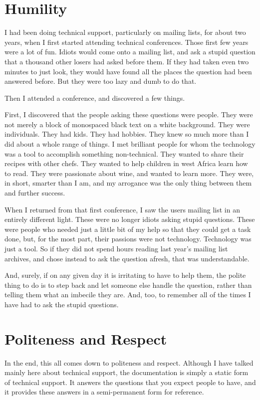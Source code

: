 \section*{Humility}
I had been doing technical support, particularly on mailing lists, for about two
years, when I first started attending technical conferences. Those first few
years were a lot of fun. Idiots would come onto a mailing list, and ask a stupid
question that a thousand other losers had asked before them. If they had taken
even two minutes to just look, they would have found all the places the question
had been answered before. But they were too lazy and dumb to do that.

Then I attended a conference, and discovered a few things.

First, I discovered that the people asking these questions were people. They
were not merely a block of monospaced black text on a white background. They
were individuals. They had kids. They had hobbies. They knew so much more than I
did about a whole range of things. I met brilliant people for whom the
technology was a tool to accomplish something non-technical. They wanted to
share their recipes with other chefs. They wanted to help children in west
Africa learn how to read. They were passionate about wine, and wanted to learn
more. They were, in short, smarter than I am, and my arrogance was the only
thing between them and further success.

When I returned from that first conference, I saw the users mailing list in an
entirely different light. These were no longer idiots asking stupid questions.
These were people who needed just a little bit of my help so that they could get
a task done, but, for the most part, their passions were not technology.
Technology was just a tool. So if they did not spend hours reading last year’s
mailing list archives, and chose instead to ask the question afresh, that was
understandable.

And, surely, if on any given day it is irritating to have to help them, the
polite thing to do is to step back and let someone else handle the question,
rather than telling them what an imbecile they are. And, too, to remember all of
the times I have had to ask the stupid questions.

\section*{Politeness and Respect}
In the end, this all comes down to politeness and respect. Although I have
talked mainly here about technical support, the documentation is simply a static
form of technical support. It answers the questions that you expect people to
have, and it provides these answers in a semi-permanent form for reference.

